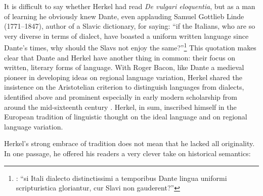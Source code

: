 \noindent It is difficult to say whether Herkel had read \textit{De vulgari eloquentia}, but as a man of learning he obviously knew Dante, even applauding Samuel Gottlieb Linde (1771--1847), author of a Slavic dictionary, for saying: “if the Italians, who are so very diverse in terms of dialect, have boasted a uniform written language since Dante’s times, why should the Slavs not enjoy the same?”\footnote{\citet[23]{herkel_elementa_1826}: “si Itali dialecto distinctissimi a temporibus Dante lingua uniformi scripturistica gloriantur, cur Slavi non gauderent?”} This quotation makes clear that Dante and Herkel have another thing in common: their focus on written, literary forms of language. With Roger Bacon, like Dante a medieval pioneer in developing ideas on regional language variation, Herkel shared the insistence on the Aristotelian criterion to distinguish languages from dialects, identified above and prominent especially in early modern scholarship from around the mid-sixteenth century \citep[190--194]{van_rooy_regional_2018}. Herkel, in sum, inscribed himself in the European tradition of linguistic thought on the ideal language and on regional language variation.

Herkel’s strong embrace of tradition does not mean that he lacked all originality. In one passage, he offered his readers a very clever take on historical semantics:

